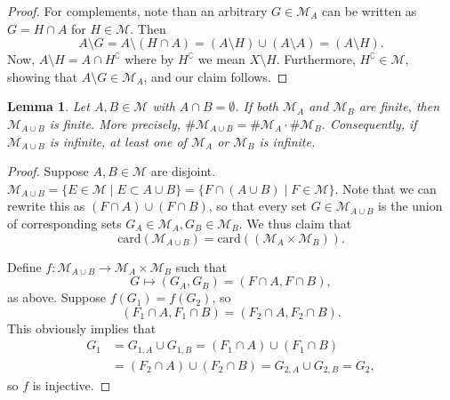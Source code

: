 \documentclass[12pt]{article}
\newenvironment{problem}[2][Problem]{\begin{trivlist}
    \item[\hskip \labelsep {\bfseries #1}\hskip \labelsep {\bfseries #2.}]}{\end{trivlist}}
\newtheorem{lem}[thm]{Lemma}
\theoremstyle{definition}
\begin{document}
\begin{problem}{1.2.3}
\begin{enumerate}[label=(\alph*)]
\begin{proof}
            For complements, note than an arbitrary \( G \in \mathcal{M}_A \) can be written as \( G = H \cap A \) for \( H \in \mathcal{M} \).
            Then
            \begin{equation}
            \label{eq:39}
            A \setminus G = A \setminus (H \cap A) = (A \setminus H) \cup (A \setminus A) = (A \setminus H).
          \end{equation}
          Now, \( A \setminus H = A \cap H^{\complement} \) where by \( H^{\complement} \) we mean \( X \setminus H \).
          Furthermore, \( H^{\complement} \in \mathcal{M} \), showing that \( A \setminus G \in \mathcal{M}_A \), and our claim follows.
		      \end{proof}
          \begin{lem}
            \label{lem:2}
            Let \( A, B \in \mathcal{M} \) with \( A \cap B = \emptyset \).
            If both \( \mathcal{M}_A \) and \( \mathcal{M}_B \) are finite, then \( \mathcal{M}_{A \cup B} \) is finite.
            More precisely, \( \# \mathcal{M}_{A \cup B} = \# \mathcal{M}_A \cdot \# \mathcal{M}_B \).
            Consequently, if \( \mathcal{M}_{A \cup B} \) is infinite, at least one of \( \mathcal{M}_A \) or \( \mathcal{M}_B \) is infinite.
          \end{lem}
          \begin{proof}
            Suppose \( A, B \in \mathcal{M} \) are disjoint.
            \( \mathcal{M}_{A \cup B} = \{ E \in \mathcal{M} \mid E \subset A \cup B \} = \{ F \cap (A \cup B) \mid F \in \mathcal{M} \}\).
            Note that we can rewrite this as \( (F \cap A) \cup (F \cap B) \), so that every set \( G \in \mathcal{M}_{A \cup B} \) is the union of corresponding sets \( G_A \in \mathcal{M}_A, G_B \in \mathcal{M}_B \).
            We thus claim that
            \begin{equation}
            \text{card}(\mathcal{M}_{A \cup B}) = \text{card}(\left( \mathcal{M}_A \times \mathcal{M}_B  \right)).
            \end{equation}

            Define \( f: \mathcal{M}_{A \cup B} \rightarrow \mathcal{M}_A \times \mathcal{M}_B \) such that
            \begin{equation}
            \label{eq:40}
            G \mapsto (G_A, G_B) = (F \cap A, F \cap B),
            \end{equation}
            as above.
            Suppose \( f(G_1) = f(G_2) \), so
            \begin{equation}
            \label{eq:41}
            (F_1 \cap A, F_1 \cap B) = (F_2 \cap A, F_2 \cap B).
            \end{equation}
            This obviously implies that
            \begin{align}
            \label{eq:42}
              G_1 &= G_{1,A} \cup G_{1,B} = (F_1 \cap A) \cup (F_1 \cap B)\\
              &= (F_2 \cap A) \cup (F_2 \cap B) = G_{2, A} \cup G_{2, B} = G_2,
            \end{align}
            so \( f \) is injective.


\end{proof}
\end{enumerate}
\end{problem}
\end{document}
